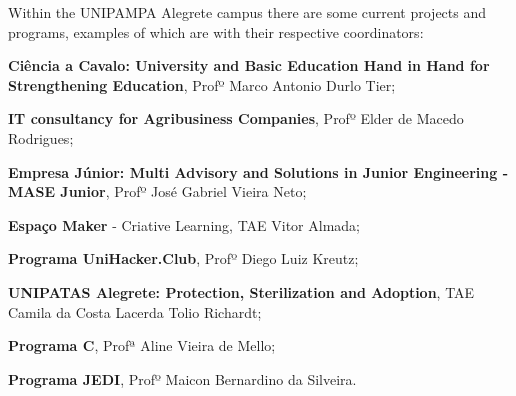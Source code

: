 
Within the \ac{UNIPAMPA} Alegrete campus there are some current projects and programs, examples of which are with their respective coordinators:
\begin{inparaenum}[(1)]
  \item \textbf{Ciência a Cavalo: University and Basic Education Hand in Hand for Strengthening Education}, Profº Marco Antonio Durlo Tier;
  \item \textbf{IT consultancy for Agribusiness Companies}, Profº Elder de Macedo Rodrigues;
  \item \textbf{Empresa Júnior: Multi Advisory and Solutions in Junior Engineering - MASE Junior}, Profº José Gabriel Vieira Neto;
  \item \textbf{Espaço Maker} - Criative Learning, TAE Vitor Almada;
  \item \textbf{Programa UniHacker.Club}, Profº Diego Luiz Kreutz;
  \item \textbf{UNIPATAS Alegrete: Protection, Sterilization and Adoption}, TAE Camila da Costa Lacerda Tolio Richardt;
  \item \textbf{Programa C}, Profª Aline Vieira de Mello;
  \item \textbf{Programa JEDI}, Profº Maicon Bernardino da Silveira.
\end{inparaenum}

